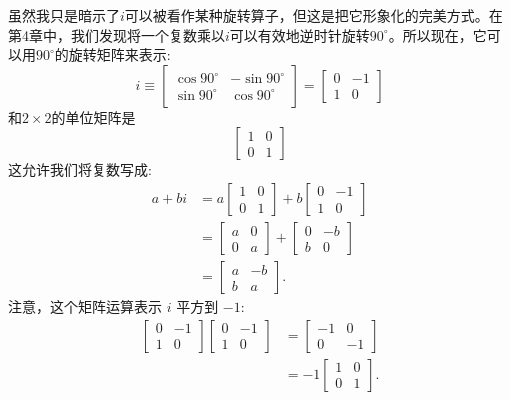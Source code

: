 虽然我只是暗示了$ i $可以被看作某种旋转算子，但这是把它形象化的完美方式。在第4章中，我们发现将一个复数乘以$i$可以有效地逆时针旋转$90^{\circ}$。所以现在，它可以用$90^{\circ}$的旋转矩阵来表示:
$$
i \equiv\left[\begin{array}{cc}
\cos 90^{\circ} & -\sin 90^{\circ} \\
\sin 90^{\circ} & \cos 90^{\circ}
\end{array}\right]=\left[\begin{array}{cc}
0 & -1 \\
1 & 0
\end{array}\right]
$$
和$2 \times 2$的单位矩阵是
$$
\left[\begin{array}{ll}
1 & 0 \\
0 & 1
\end{array}\right]
$$
这允许我们将复数写成:
$$
\begin{aligned}
a+b i & =a\left[\begin{array}{ll}
1 & 0 \\
0 & 1
\end{array}\right]+b\left[\begin{array}{cc}
0 & -1 \\
1 & 0
\end{array}\right] \\
& =\left[\begin{array}{ll}
a & 0 \\
0 & a
\end{array}\right]+\left[\begin{array}{cc}
0 & -b \\
b & 0
\end{array}\right] \\
& =\left[\begin{array}{cc}
a & -b \\
b & a
\end{array}\right] .
\end{aligned}
$$
注意，这个矩阵运算表示 $i$ 平方到 $-1$:
$$
\begin{aligned}
{\left[\begin{array}{cc}
0 & -1 \\
1 & 0
\end{array}\right]\left[\begin{array}{cc}
0 & -1 \\
1 & 0
\end{array}\right] } & =\left[\begin{array}{cc}
-1 & 0 \\
0 & -1
\end{array}\right] \\
& =-1\left[\begin{array}{ll}
1 & 0 \\
0 & 1
\end{array}\right] .
\end{aligned}
$$

